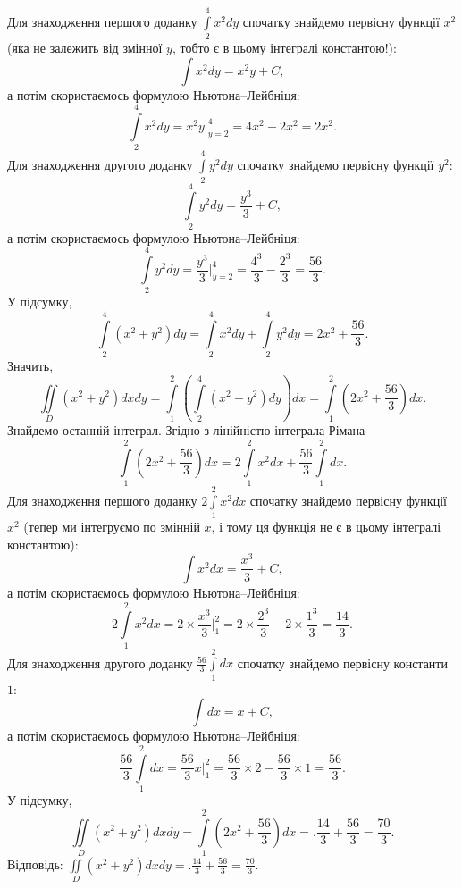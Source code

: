 \begin{example}
Для знаходження першого доданку ${\int\limits_{2}^{4}x^{2}d y}$ спочатку знайдемо первісну функції ${x^2}$ (яка не залежить від змінної $y$, тобто є в цьому інтегралі константою!):
\[
\int x^{2}d y = x^2 y + C,
\]
а потім скористаємось формулою Ньютона--Лейбніця:
\[
\int\limits_{2}^{4}x^{2}d y = x^2 y \biggr|_{y=2}^4 = 4 x^2 - 2 x^2 = 2 x^2.
\]
Для знаходження другого доданку ${\int\limits_{2}^{4}y^{2}d y}$ спочатку знайдемо первісну функції ${y^2}$:
\[
\int\limits_{2}^{4}y^{2}d y = \frac{y^3}{3} + C,
\]
а потім скористаємось формулою Ньютона--Лейбніця:
\[
\int\limits_{2}^{4}y^{2}d y = \frac{y^3}{3} \biggr|_{y=2}^4 = \frac{4^3}{3} - \frac{2^3}{3} = \frac{56}{3}.
\]
У підсумку,
\[
\int\limits_{2}^{4}\left(x^{2}+y^{2}\right)d y = \int\limits_{2}^{4}x^{2}d y+\int\limits_{2}^{4}y^{2}d y = 2 x^2 + \frac{56}{3}.
\]
Значить,
\[
\iint\limits_{D}\left(x^2+y^2\right)d x d y = \int\limits_1^2\left(\int\limits_{2}^{4}\left(x^{2}+y^{2}\right)d y\right)dx = \int\limits_1^2\left(2 x^2 + \frac{56}{3}\right)dx.
\]
Знайдемо останній інтеграл. Згідно з лінійністю інтеграла Рімана
\[
\int\limits_1^2\left(2 x^2 + \frac{56}{3}\right)dx = 2 \int\limits_1^2 x^2 d x + \frac{56}{3}\int\limits_1^2dx.
\]
Для знаходження першого доданку ${2\int\limits_1^2 x^2 d x}$ спочатку знайдемо первісну функції ${x^2}$ (тепер ми інтегруємо по змінній $x$, і тому ця функція не  є в цьому інтегралі константою):
\[
\int x^{2}d x = \frac{x^3}{3} + C,
\]
а потім скористаємось формулою Ньютона--Лейбніця:
\[
2\int\limits_{1}^{2}x^{2}d x = 2 \times\frac{x^3}{3} \biggr|_{1}^2 = 2\times \frac{2^3}{3} - 2\times \frac{1^3}{3} = \frac{14}{3}.
\]
Для знаходження другого доданку ${\frac{56}{3}\int\limits_1^2dx}$ спочатку знайдемо первісну константи ${1}$:
\[
\int\limits d x = x + C,
\]
а потім скористаємось формулою Ньютона--Лейбніця:
\[
\frac{56}{3}\int\limits_{1}^{2} d x = \frac{56}{3} x \biggr|_{1}^2 = \frac{56}{3}\times 2 - \frac{56}{3} \times 1 = \frac{56}{3}.
\]
У підсумку,
\[
\iint\limits_{D}\left(x^2+y^2\right)d x d y =  \int\limits_1^2\left(2 x^2 + \frac{56}{3}\right)dx = .\frac{14}{3} + \frac{56}{3} = \frac{70}{3}.
\]
Відповідь: ${\iint\limits_{D}\left(x^2+y^2\right)d x d y = .\frac{14}{3} + \frac{56}{3} = \frac{70}{3}.}$
\end{example}

